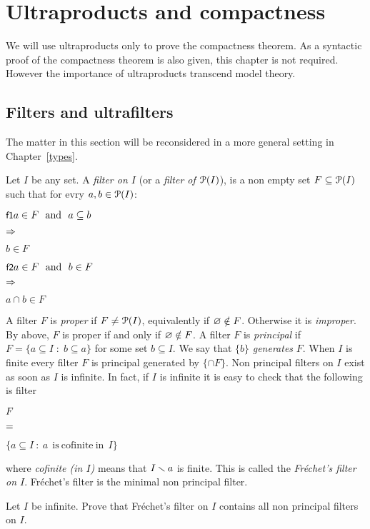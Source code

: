 \documentclass[creche.tex]{subfiles}
\begin{document}
\chapter{Ultraproducts and compactness}
\label{ultraprodotti}

\def\medrel#1{\parbox[t]{6ex}{$\displaystyle\hfil #1$}}
\def\ceq#1#2#3{\parbox{25ex}{$\displaystyle #1$}\medrel{#2}$\displaystyle  #3$}

We will use ultraproducts only to prove the compactness theorem. As a syntactic proof of the compactness theorem is also given, this chapter is not required. However the importance of ultraproducts transcend model theory.


\section{Filters and ultrafilters}\label{ultrafiltri}

The matter in this section will be reconsidered in a more general setting in Chapter~\ref{types}.

Let $I$ be any set. A \emph{filter on $I$\/} (or a \emph{filter of $\P(I)$}), is a non empty set $F\subseteq \P(I)$ such that for evry $a, b\in \P(I)$:

\ceq{\ssf{f1}\hfill a\in F\ \ \textrm{and}\ \ a\subseteq b}{\IMP}{b\in F}

\ceq{\ssf{f2}\hfill a\in F\ \ \textrm{and}\ \ b\in F}{\IMP}{a\cap b\in F}

A filter $F$ is \emph{proper\/} if $F\neq\P(I)$, equivalently if $\0\notin F$. Otherwise it is \emph{improper}. By  above, $F$ is proper if and only if $\0\notin F$. A filter $F$ is \emph{principal\/} if $F=\{a\subseteq I\; :\; b\subseteq a\}$ for some set $b\subseteq I$. We say that $\{b\}$ \emph{generates\/} $F$. When $I$ is finite every filter $F$ is principal generated by $\{\cap F\}$. Non principal filters on $I$ exist as soon as $I$ is infinite. In fact, if $I$ is infinite it is easy to check that the following is filter

\ceq{\hfill F}{=}{\Big\{a\subseteq I\ :\ a \ \mathrm{\ is\ cofinite\ in\ }\ I\Big\}}

where \emph{cofinite (in $I$)} means that $I\sm a$ is finite. This is called the \emph{Fr\'echet's filter on $I$}. Fr\'echet's filter is the minimal non principal filter.

\begin{exercise}
Let $I$ be infinite. Prove that  Fr\'echet's filter on $I$ contains all non principal filters on $I$.\QED
\end{exercise}
\end{document}
